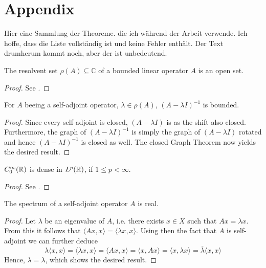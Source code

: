 \chapter*{Appendix}  


Hier eine Sammlung der Theoreme. die ich während der Arbeit verwende. Ich hoffe, dass die Liste vollständig ist und keine Fehler enthält. Der Text drumherum kommt noch, aber der ist unbedeutend. %

\begin{atheorem}
	The resolvent set $\rho(A) \subseteq \mathbb{C}$ of a bounded linear operator $A$ is an open set.
	
	\begin{proof}
		See \cite[page 259]{WernerFA}.
	\end{proof}
\end{atheorem}

\begin{atheorem}
	For $A$ beeing a self-adjoint operator, $\lambda \in \rho(A)$, $(A - \lambda I)^{-1}$ is bounded.
	
	\begin{proof}
		Since every self-adjoint is closed, $(A - \lambda I)$ is as the shift also closed. Furthermore, the graph of $(A - \lambda I)^{-1}$ is simply the graph of $(A - \lambda I)$ rotated and hence $(A - \lambda I)^{-1}$ is closed as well. The closed Graph Theorem now yields the desired result.
	\end{proof}
\end{atheorem}

\begin{atheorem}
	$C_{0}^{\infty}(\mathbb{R})$ is dense in $L^{p}(\mathbb{R})$, if $1 \leq p < \infty$.
	
	\begin{proof}
		See \cite[page 82]{WernerFA}. %
	\end{proof}
\end{atheorem}

\begin{atheorem}
	The spectrum of a self-adjoint operator $A$ is real.
	
	\begin{proof}
		Let $\lambda$ be an eigenvalue of $A$, i.e. there exists $x \in X$ such that $A x = \lambda x$. From this it follows that $\langle A x, x \rangle = \langle \lambda x , x \rangle$. Using then the fact that $A$ is self-adjoint we can further deduce
		\[ \lambda \langle x , x \rangle = \langle \lambda x , x \rangle = \langle A x, x \rangle = \langle x, A x \rangle = \langle x , \lambda x \rangle = \overline{\lambda} \langle  x , x \rangle \]
		Hence, $\lambda = \overline{\lambda}$, which shows the desired result.
	\end{proof}
\end{atheorem}

